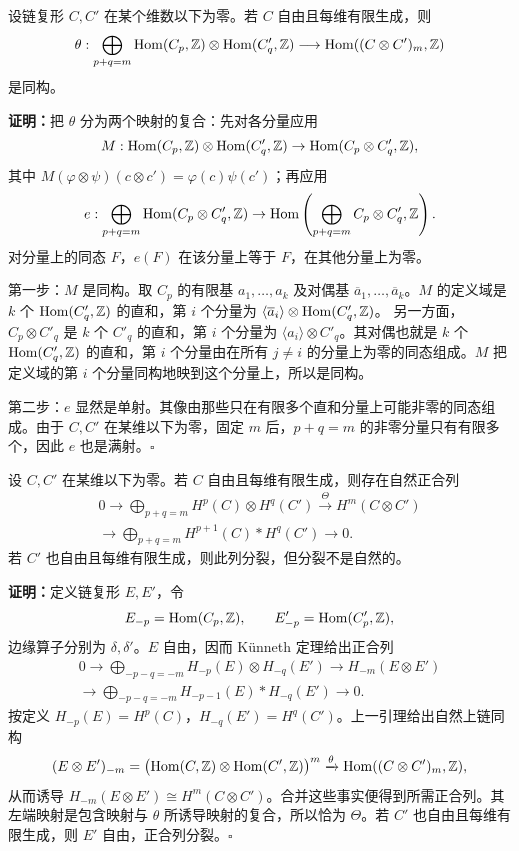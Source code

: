 设链复形 $C,C'$ 在某个维数以下为零。若 $C$ 自由且每维有限生成，则
\[
\theta:\bigoplus_{p+q=m}\operatorname{Hom}(C_p,\mathbb{Z})\otimes\operatorname{Hom}(C'_q,\mathbb{Z})
\longrightarrow\operatorname{Hom}((C\otimes C')_m,\mathbb{Z})
\]
是同构。

\textbf{证明：}把 $\theta$ 分为两个映射的复合：先对各分量应用
\[
M:\operatorname{Hom}(C_p,\mathbb{Z})\otimes\operatorname{Hom}(C'_q,\mathbb{Z})
\to\operatorname{Hom}(C_p\otimes C'_q,\mathbb{Z}),
\]
其中 $M(\varphi\otimes\psi)(c\otimes c')=\varphi(c)\psi(c')$；再应用
\[
e:\bigoplus_{p+q=m}\operatorname{Hom}(C_p\otimes C'_q,\mathbb{Z})
\to\operatorname{Hom}\left(\bigoplus_{p+q=m}C_p\otimes C'_q,\mathbb{Z}\right).
\]
对分量上的同态 $F$，$e(F)$ 在该分量上等于 $F$，在其他分量上为零。

第一步：$M$ 是同构。取 $C_p$ 的有限基 $a_1,\ldots,a_k$ 及对偶基 $\overline a_1,\ldots,\overline a_k$。$M$ 的定义域是 $k$ 个 $\operatorname{Hom}(C'_q,\mathbb{Z})$ 的直和，第 $i$ 个分量为
$\langle\overline a_i\rangle\otimes\operatorname{Hom}(C'_q,\mathbb{Z})$。
另一方面，$C_p\otimes C'_q$ 是 $k$ 个 $C'_q$ 的直和，第 $i$ 个分量为 $\langle a_i\rangle\otimes C'_q$。其对偶也就是 $k$ 个 $\operatorname{Hom}(C'_q,\mathbb{Z})$ 的直和，第 $i$ 个分量由在所有 $j\ne i$ 的分量上为零的同态组成。$M$ 把定义域的第 $i$ 个分量同构地映到这个分量上，所以是同构。

第二步：$e$ 显然是单射。其像由那些只在有限多个直和分量上可能非零的同态组成。由于 $C,C'$ 在某维以下为零，固定 $m$ 后，$p+q=m$ 的非零分量只有有限多个，因此 $e$ 也是满射。\hfill$\square$

设 $C,C'$ 在某维以下为零。若 $C$ 自由且每维有限生成，则存在自然正合列
\[
\begin{split}
0\longrightarrow\bigoplus_{p+q=m}H^p(C)\otimes H^q(C')
\xrightarrow{\Theta}H^m(C\otimes C')\\
\longrightarrow\bigoplus_{p+q=m}H^{p+1}(C)*H^q(C')\longrightarrow0.
\end{split}
\]
若 $C'$ 也自由且每维有限生成，则此列分裂，但分裂不是自然的。

\textbf{证明：}定义链复形 $E,E'$，令
\[
E_{-p}=\operatorname{Hom}(C_p,\mathbb{Z}),\qquad E'_{-p}=\operatorname{Hom}(C'_p,\mathbb{Z}),
\]
边缘算子分别为 $\delta,\delta'$。$E$ 自由，因而 Künneth 定理给出正合列
\[
\begin{split}
0\to\bigoplus_{-p-q=-m}H_{-p}(E)\otimes H_{-q}(E')\to H_{-m}(E\otimes E')\\
\to\bigoplus_{-p-q=-m}H_{-p-1}(E)*H_{-q}(E')\to0.
\end{split}
\]
按定义 $H_{-p}(E)=H^p(C)$，$H_{-q}(E')=H^q(C')$。上一引理给出自然上链同构
\[
(E\otimes E')_{-m}=
\bigl(\operatorname{Hom}(C,\mathbb{Z})\otimes\operatorname{Hom}(C',\mathbb{Z})\bigr)^m
\xrightarrow{\theta}\operatorname{Hom}((C\otimes C')_m,\mathbb{Z}),
\]
从而诱导 $H_{-m}(E\otimes E')\cong H^m(C\otimes C')$。合并这些事实便得到所需正合列。其左端映射是包含映射与 $\theta$ 所诱导映射的复合，所以恰为 $\Theta$。若 $C'$ 也自由且每维有限生成，则 $E'$ 自由，正合列分裂。\hfill$\square$

